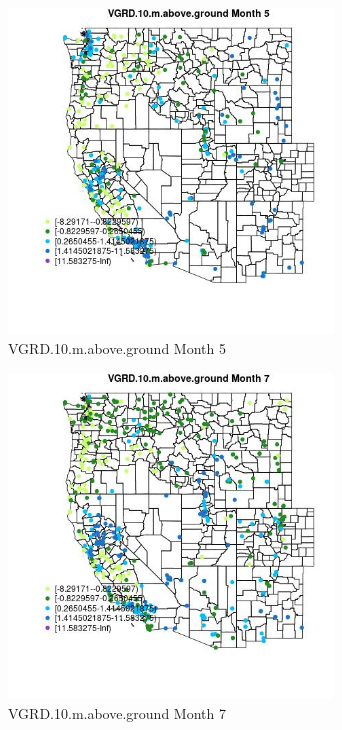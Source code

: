 \begin{figure} 
\centering  
\includegraphics[width=0.77\textwidth]{Code_Outputs/Report_ML_input_PM25_Step4_part_e_de_duplicated_aves_compiled_2019-05-18wNAs_MapObsMo5VGRD10maboveground.jpg} 
\caption{\label{fig:Report_ML_input_PM25_Step4_part_e_de_duplicated_aves_compiled_2019-05-18wNAsMapObsMo5VGRD10maboveground}VGRD.10.m.above.ground Month 5} 
\end{figure} 
 

\begin{figure} 
\centering  
\includegraphics[width=0.77\textwidth]{Code_Outputs/Report_ML_input_PM25_Step4_part_e_de_duplicated_aves_compiled_2019-05-18wNAs_MapObsMo7VGRD10maboveground.jpg} 
\caption{\label{fig:Report_ML_input_PM25_Step4_part_e_de_duplicated_aves_compiled_2019-05-18wNAsMapObsMo7VGRD10maboveground}VGRD.10.m.above.ground Month 7} 
\end{figure} 
 

